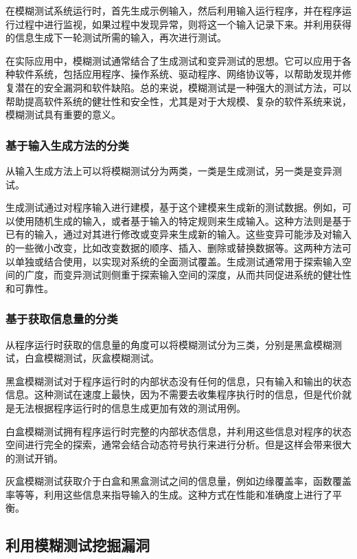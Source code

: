 在模糊测试系统运行时，首先生成示例输入，然后利用输入运行程序，并在程序运行过程中进行监视，如果过程中发现异常，则将这一个输入记录下来。并利用获得的信息生成下一轮测试所需的输入，再次进行测试。

在实际应用中，模糊测试通常结合了生成测试和变异测试的思想。它可以应用于各种软件系统，包括应用程序、操作系统、驱动程序、网络协议等，以帮助发现并修复潜在的安全漏洞和软件缺陷。总的来说，模糊测试是一种强大的测试方法，可以帮助提高软件系统的健壮性和安全性，尤其是对于大规模、复杂的软件系统来说，模糊测试具有重要的意义。

\subsubsection{基于输入生成方法的分类}

从输入生成方法上可以将模糊测试分为两类，一类是生成测试，另一类是变异测试。

生成测试通过对程序输入进行建模，基于这个建模来生成新的测试数据。例如，可以使用随机生成的输入，或者基于输入的特定规则来生成输入。这种方法则是基于已有的输入，通过对其进行修改或变异来生成新的输入。这些变异可能涉及对输入的一些微小改变，比如改变数据的顺序、插入、删除或替换数据等。这两种方法可以单独或结合使用，以实现对系统的全面测试覆盖。生成测试通常用于探索输入空间的广度，而变异测试则侧重于探索输入空间的深度，从而共同促进系统的健壮性和可靠性。

\subsubsection{基于获取信息量的分类}

从程序运行时获取的信息量的角度可以将模糊测试分为三类，分别是黑盒模糊测试，白盒模糊测试，灰盒模糊测试。

黑盒模糊测试对于程序运行时的内部状态没有任何的信息，只有输入和输出的状态信息。这种测试在速度上最快，因为不需要去收集程序执行时的信息，但是代价就是无法根据程序运行时的信息生成更加有效的测试用例。

白盒模糊测试拥有程序运行时完整的内部状态信息，并利用这些信息对程序的状态空间进行完全的探索，通常会结合动态符号执行来进行分析。但是这样会带来很大的测试开销。

灰盒模糊测试获取介于白盒和黑盒测试之间的信息量，例如边缘覆盖率，函数覆盖率等等，利用这些信息来指导输入的生成。这种方式在性能和准确度上进行了平衡。

\subsection{利用模糊测试挖掘漏洞}

